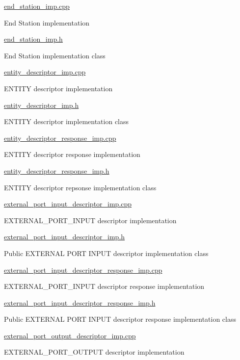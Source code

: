 \hyperlink{end__station__imp_8cpp}{end\+\_\+station\+\_\+imp.\+cpp}

End Station implementation

\hyperlink{end__station__imp_8h}{end\+\_\+station\+\_\+imp.\+h}

End Station implementation class

\hyperlink{entity__descriptor__imp_8cpp}{entity\+\_\+descriptor\+\_\+imp.\+cpp}

E\+N\+T\+I\+TY descriptor implementation

\hyperlink{entity__descriptor__imp_8h}{entity\+\_\+descriptor\+\_\+imp.\+h}

E\+N\+T\+I\+TY descriptor implementation class

\hyperlink{entity__descriptor__response__imp_8cpp}{entity\+\_\+descriptor\+\_\+response\+\_\+imp.\+cpp}

E\+N\+T\+I\+TY descriptor response implementation

\hyperlink{entity__descriptor__response__imp_8h}{entity\+\_\+descriptor\+\_\+response\+\_\+imp.\+h}

E\+N\+T\+I\+TY descriptor repsonse implementation class

\hyperlink{external__port__input__descriptor__imp_8cpp}{external\+\_\+port\+\_\+input\+\_\+descriptor\+\_\+imp.\+cpp}

E\+X\+T\+E\+R\+N\+A\+L\+\_\+\+P\+O\+R\+T\+\_\+\+I\+N\+P\+UT descriptor implementation

\hyperlink{external__port__input__descriptor__imp_8h}{external\+\_\+port\+\_\+input\+\_\+descriptor\+\_\+imp.\+h}

Public E\+X\+T\+E\+R\+N\+AL P\+O\+RT I\+N\+P\+UT descriptor implementation class

\hyperlink{external__port__input__descriptor__response__imp_8cpp}{external\+\_\+port\+\_\+input\+\_\+descriptor\+\_\+response\+\_\+imp.\+cpp}

E\+X\+T\+E\+R\+N\+A\+L\+\_\+\+P\+O\+R\+T\+\_\+\+I\+N\+P\+UT descriptor response implementation

\hyperlink{external__port__input__descriptor__response__imp_8h}{external\+\_\+port\+\_\+input\+\_\+descriptor\+\_\+response\+\_\+imp.\+h}

Public E\+X\+T\+E\+R\+N\+AL P\+O\+RT I\+N\+P\+UT descriptor response implementation class

\hyperlink{external__port__output__descriptor__imp_8cpp}{external\+\_\+port\+\_\+output\+\_\+descriptor\+\_\+imp.\+cpp}

E\+X\+T\+E\+R\+N\+A\+L\+\_\+\+P\+O\+R\+T\+\_\+\+O\+U\+T\+P\+UT descriptor implementation

